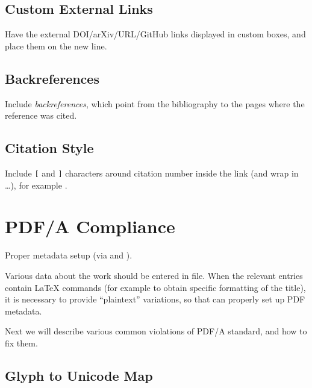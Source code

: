 \subsection{Custom External Links}%
\label{sub:Custom External Links}

Have the external \textsf{DOI/arXiv/URL/GitHub} links displayed in custom boxes, and place them on the new line.

\subsection{Backreferences}%
\label{sub:Backreferences}

Include \emph{backreferences}, which point from the bibliography to the pages where the reference was cited.

\subsection{Citation Style}%
\label{sub:Citation Style}

Include \texttt{[} and \texttt{]} characters around citation number inside the link (and wrap in  \ldots), for example \autocite{TeXsis}.


\section{PDF/A Compliance}%
\label{sec:PDF/A Compliance}

Proper metadata setup (via  and \macro{\DocumentMetadata}).
\begin{remark}
    Various data about the work should be entered in  file.
    When the relevant entries contain \LaTeX{} commands (for example to obtain specific formatting of the title), it is necessary to provide \enquote{plaintext} variations, so that  can properly set up PDF metadata.
\end{remark}

Next we will describe various common violations of PDF/A standard, and how to fix them.

\subsection{Glyph to Unicode Map}%
\label{sub:Glyph to Unicode Map}


